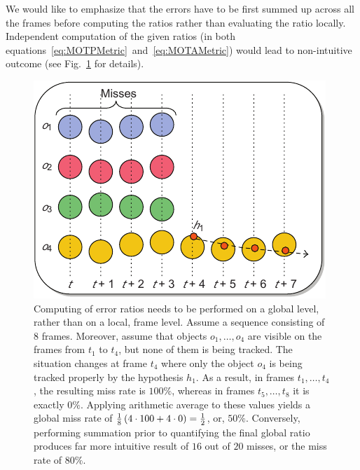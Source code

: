 We would like to emphasize that the errors have to be first summed up across all the frames before computing the ratios rather than evaluating the ratio locally. Independent computation of the given ratios (in both equations~\ref{eq:MOTPMetric}~and~\ref{eq:MOTAMetric}) would lead to non-intuitive outcome (see Fig.~\ref{fig:LocalGlobalRatioEval} for details).

\begin{figure}[t]
    \centerline{\includegraphics[width=0.6\linewidth]{figures/theoretical_foundations/local_vs_global_ratio_evaluation.pdf}}
    \caption[Local vs. global ratio evaluation]{Computing of error ratios needs to be performed on a global level, rather than on a local, frame level. Assume a sequence consisting of $8$ frames. Moreover, assume that objects $o_1, \dots, o_4$ are visible on the frames from $t_1$ to $t_4$, but none of them is being tracked. The situation changes at frame $t_4$ where only the object $o_4$ is being tracked properly by the hypothesis $h_1$. As a result, in frames $t_1, \dots, t_4$, the resulting miss rate is $100\%$, whereas in frames $t_5, \dots, t_8$ it is exactly $0\%$. Applying arithmetic average to these values yields a global miss rate of $\frac{1}{8} \left( {4 \cdot 100 + 4 \cdot 0} \right) = \frac{1}{2}$, or, $50\%$. Conversely, performing summation prior to quantifying the final global ratio produces far more intuitive result of $16$ out of $20$ misses, or the miss rate of $80\%$. }
    \label{fig:LocalGlobalRatioEval}
\end{figure}
